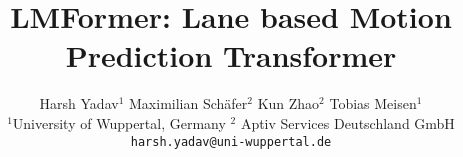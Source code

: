 \documentclass[10pt,twocolumn,letterpaper]{article}
\title{LMFormer: Lane based Motion Prediction Transformer}
\author{
    Harsh Yadav$^1$ \quad Maximilian Sch\"afer$^2$ \quad Kun Zhao$^2$ \quad Tobias Meisen$^1$\\
    $^1$University of Wuppertal, Germany \quad $^2$ Aptiv Services Deutschland GmbH \\
    {\tt\small {harsh.yadav@uni-wuppertal.de}}
}
\begin{document}
\maketitle
    





{
    \small
    
    
}

% 
\end{document}

